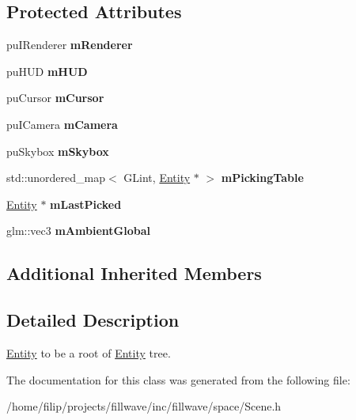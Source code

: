 \subsection*{Protected Attributes}
\begin{DoxyCompactItemize}
\item 
\mbox{\label{classflw_1_1flf_1_1Scene_ab2fc1fcac252a22b0accfa631690a57e}} 
pu\+I\+Renderer {\bfseries m\+Renderer}
\item 
\mbox{\label{classflw_1_1flf_1_1Scene_a8f42fa512174eb50b2866887ecac5252}} 
pu\+H\+UD {\bfseries m\+H\+UD}
\item 
\mbox{\label{classflw_1_1flf_1_1Scene_aab97f3319aa2e51ff46b879201b0b5f5}} 
pu\+Cursor {\bfseries m\+Cursor}
\item 
\mbox{\label{classflw_1_1flf_1_1Scene_a70bf7023f50a264c21b100cb74b42724}} 
pu\+I\+Camera {\bfseries m\+Camera}
\item 
\mbox{\label{classflw_1_1flf_1_1Scene_a2725c8c6688e40cb22dc3c51d60e8b09}} 
pu\+Skybox {\bfseries m\+Skybox}
\item 
\mbox{\label{classflw_1_1flf_1_1Scene_ad7823624ce2878347b4d31a5849690be}} 
std\+::unordered\+\_\+map$<$ G\+Lint, \hyperlink{classflw_1_1flf_1_1Entity}{Entity} $\ast$ $>$ {\bfseries m\+Picking\+Table}
\item 
\mbox{\label{classflw_1_1flf_1_1Scene_aaa3466513613f1bfd1b430fa3d2e881c}} 
\hyperlink{classflw_1_1flf_1_1Entity}{Entity} $\ast$ {\bfseries m\+Last\+Picked}
\item 
\mbox{\label{classflw_1_1flf_1_1Scene_acefee9ade6d5682058d21af96c0d0b6f}} 
glm\+::vec3 {\bfseries m\+Ambient\+Global}
\end{DoxyCompactItemize}
\subsection*{Additional Inherited Members}


\subsection{Detailed Description}
\hyperlink{classflw_1_1flf_1_1Entity}{Entity} to be a root of \hyperlink{classflw_1_1flf_1_1Entity}{Entity} tree. 

The documentation for this class was generated from the following file\+:\begin{DoxyCompactItemize}
\item 
/home/filip/projects/fillwave/inc/fillwave/space/Scene.\+h\end{DoxyCompactItemize}
